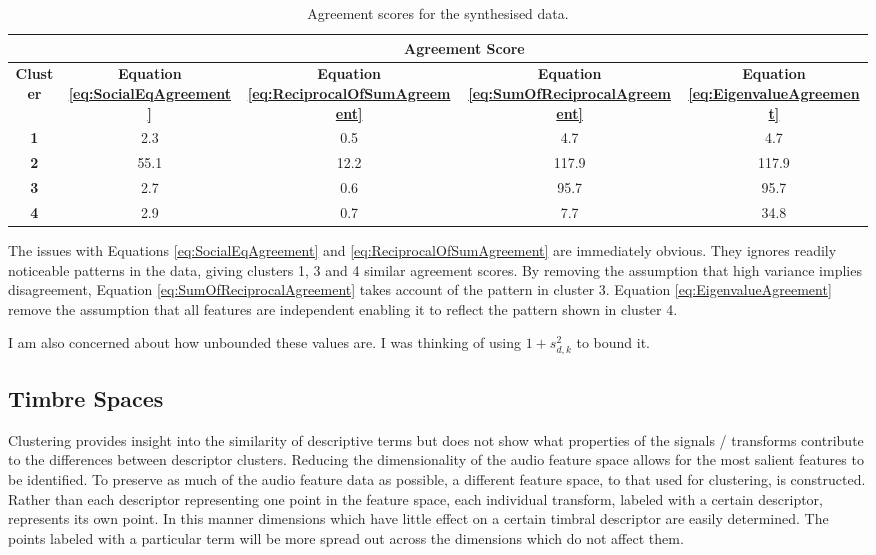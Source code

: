 			\begin{table}[h!]
				\centering
				\begin{tabular}{|c|c|c|c|c|}
					\cline{2-5}
					\multicolumn{1}{c|}{} & \multicolumn{4}{c|}{\bf{Agreement Score}} \tabularnewline
					\hline
					\bf{Cluster} & \bf{Equation \ref{eq:SocialEqAgreement}} & 
					\bf{Equation \ref{eq:ReciprocalOfSumAgreement}} &
					\bf{Equation \ref{eq:SumOfReciprocalAgreement}} & 
					\bf{Equation \ref{eq:EigenvalueAgreement}} \tabularnewline
					\hline
					\hline
					\bf{1} & 2.3 & 0.5 & 4.7 & 4.7 \tabularnewline
					\hline
					\bf{2} & 55.1 & 12.2 & 117.9 & 117.9 \tabularnewline
					\hline
					\bf{3} & 2.7 & 0.6 & 95.7 & 95.7 \tabularnewline
					\hline
					\bf{4} & 2.9 & 0.7 & 7.7 & 34.8 \tabularnewline
					\hline
				\end{tabular}
				\caption{Agreement scores for the synthesised data.}
				\label{tab:SynthesisedDataAgreement}
			\end{table}

			The issues with Equations \ref{eq:SocialEqAgreement} and \ref{eq:ReciprocalOfSumAgreement} are
			immediately obvious. They ignores readily noticeable patterns in the data, giving clusters 1, 3 and
			4 similar agreement scores. By removing the assumption that high variance implies disagreement,
			Equation \ref{eq:SumOfReciprocalAgreement} takes account of the pattern in cluster 3. Equation
			\ref{eq:EigenvalueAgreement} remove the assumption that all features are independent enabling it to
			reflect the pattern shown in cluster 4.

			\note
			{
				I am also concerned about how unbounded these values are. I was thinking of using $1 +
				s_{d,k}^{2}$ to bound it.
			}

	\subsection{Timbre Spaces}
	\label{sec:TimbreEvaluation-Analysis-TimbreSpaces}
		Clustering provides insight into the similarity of descriptive terms but does not show what properties of
		the signals / transforms contribute to the differences between descriptor clusters. Reducing the
		dimensionality of the audio feature space allows for the most salient features to be identified. To
		preserve as much of the audio feature data as possible, a different feature space, to that used for
		clustering, is constructed. Rather than each descriptor representing one point in the feature space, each
		individual transform, labeled with a certain descriptor, represents its own point. In this manner
		dimensions which have little effect on a certain timbral descriptor are easily determined. The points
		labeled with a particular term will be more spread out across the dimensions which do not affect them. 
		
